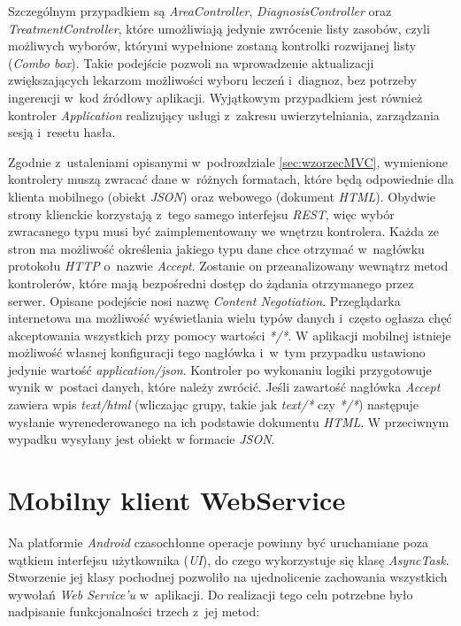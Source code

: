 \documentclass[11pt]{aghdpl}
\begin{document}
Szczególnym przypadkiem są \emph{AreaController}, \emph{DiagnosisController} oraz \emph{TreatmentController}, które umożliwiają jedynie zwrócenie listy zasobów, czyli możliwych wyborów, którymi wypełnione zostaną kontrolki rozwijanej listy (\emph{Combo box}). Takie podejście pozwoli na wprowadzenie aktualizacji zwiększających lekarzom możliwości wyboru leczeń i~diagnoz, bez potrzeby ingerencji w~kod źródłowy aplikacji. Wyjątkowym przypadkiem jest również kontroler \emph{Application} realizujący usługi z~zakresu uwierzytelniania, zarządzania sesją i~resetu hasła.

Zgodnie z~ustaleniami opisanymi w~podrozdziale \ref{sec:wzorzecMVC}, wymienione kontrolery muszą zwracać dane w~różnych formatach, które będą odpowiednie dla klienta mobilnego (obiekt \emph{JSON}) oraz webowego (dokument \emph{HTML}). Obydwie strony klienckie korzystają z~tego samego interfejsu \emph{REST}, więc wybór zwracanego typu musi być zaimplementowany we wnętrzu kontrolera. Każda ze stron ma możliwość określenia jakiego typu dane chce otrzymać w~nagłówku protokołu \emph{HTTP} o~nazwie \emph{Accept}. Zostanie on przeanalizowany wewnątrz metod kontrolerów, które mają bezpośredni dostęp do żądania otrzymanego przez serwer. Opisane podejście nosi nazwę \emph{Content Negotiation}. Przeglądarka internetowa ma możliwość wyświetlania wielu typów danych i~często ogłasza chęć akceptowania wszystkich przy pomocy wartości \emph{*/*}. W aplikacji mobilnej istnieje możliwość własnej konfiguracji tego nagłówka i~w~tym przypadku ustawiono jedynie wartość \emph{application/json}. Kontroler po wykonaniu logiki przygotowuje wynik w~postaci danych, które należy zwrócić. Jeśli zawartość nagłówka \emph{Accept} zawiera wpis \emph{text/html} (wliczając grupy, takie jak \emph{text/*} czy \emph{*/*}) następuje wysłanie wyrenederowanego na ich podstawie dokumentu \emph{HTML}. W przeciwnym wypadku wysyłany jest obiekt w formacie \emph{JSON}.

\section{Mobilny klient WebService}

Na platformie \emph{Android} czasochłonne operacje powinny być uruchamiane poza wątkiem interfejsu użytkownika (\emph{UI}), do czego wykorzystuje się klasę \emph{AsyncTask}. Stworzenie jej klasy pochodnej pozwoliło na ujednolicenie zachowania wszystkich wywołań \emph{Web Service'u} w~aplikacji. Do realizacji tego celu potrzebne było nadpisanie funkcjonalności trzech z~jej metod:
\end{document}
